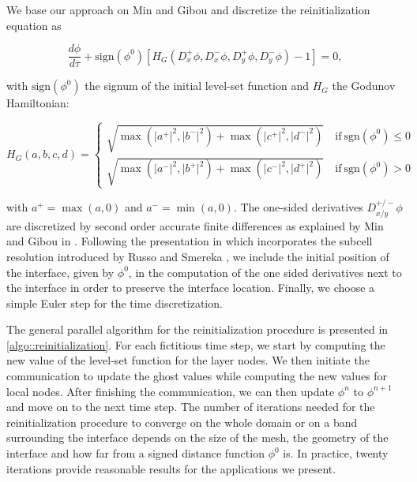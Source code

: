 We base our approach on Min and Gibou \cite{Min;Gibou:07:A-second-order-accur} and discretize the reinitialization equation as

\begin{equation*}
\frac{d\phi}{d\tau} + \mathrm{sign}(\phi^0)[H_G(D^+_x\phi, D^-_x\phi, D^+_y\phi, D^-_y\phi)-1] = 0,
\end{equation*}

with $\mathrm{sign}(\phi^0)$ the signum of the initial level-set function and $H_G$ the Godunov Hamiltonian:

\begin{equation*}
H_G(a,b,c,d) =
\begin{cases}
\sqrt{\max(\lvert a^+ \rvert^2, \lvert b^- \rvert^2) + \max(\lvert c^+ \rvert^2, \lvert d^- \rvert^2)} \quad \mathrm{if~sgn}(\phi^0) \leq 0\\
\sqrt{\max(\lvert a^- \rvert^2, \lvert b^+ \rvert^2) + \max(\lvert c^- \rvert^2, \lvert d^+ \rvert^2)} \quad \mathrm{if~sgn}(\phi^0) > 0
\end{cases}
\end{equation*}

with $a^+=\max(a,0)$ and $a^-=\min(a,0)$. The one-sided derivatives $D^{+/-}_{x/y}\phi$ are discretized by second order accurate finite differences as explained by Min and Gibou in \cite{Min;Gibou:07:A-second-order-accur}. Following the presentation in \cite{Min;Gibou:07:A-second-order-accur} which incorporates the subcell resolution introduced by Russo and Smereka \cite{Russo;Smereka:00:A-Remark-on-Computin}, we include the initial position of the interface, given by $\phi^0$, in the computation of the one sided derivatives next to the interface in order to preserve the interface location. Finally, we choose a simple Euler step for the time discretization.

The general parallel algorithm for the reinitialization procedure is presented in \ref{algo::reinitialization}. For each fictitious time step, we start by computing the new value of the level-set function for the layer nodes. We then initiate the communication to update the ghost values while computing the new values for local nodes. After finishing the communication, we can then update $\phi^n$ to $\phi^{n+1}$ and move on to the next time step. The number of iterations needed for the reinitialization procedure to converge on the whole domain or on a band surrounding the interface depends on the size of the mesh, the geometry of the interface and how far from a signed distance function $\phi^0$ is. In practice, twenty iterations provide reasonable results for the applications we present.

